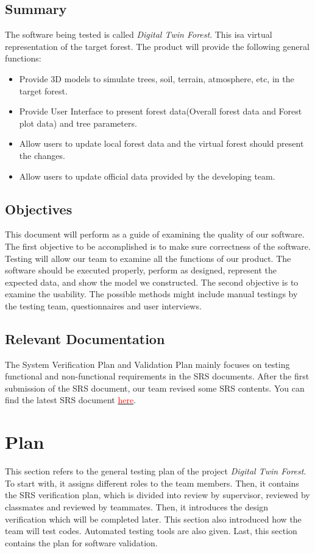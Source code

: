 \documentclass[12pt, titlepage]{article}
\begin{document}
\subsection{Summary}
The software being tested is called \textit{Digital Twin Forest}. This isa
virtual representation of the target forest. The product will provide the 
following general functions:
\begin{itemize}
    \item Provide 3D models to simulate trees, soil, terrain, atmosphere, etc,
    in the target forest.
    \item Provide User Interface to present forest data(Overall forest
    data and Forest plot data) and tree parameters.
    \item Allow users to update local forest data and the virtual forest
    should present the changes.
    \item Allow users to update official data provided by the developing
    team.
\end{itemize}

\subsection{Objectives}

This document will perform as a guide of examining the quality of our software. The
first objective to be accomplished is to make sure correctness of the software.
Testing will allow our team to examine all the functions of our product. The software
should be executed properly, perform as designed, represent the expected data, and
show the model we constructed. The second objective is to examine the usability. The
possible methods might include manual testings by the testing team, questionnaires and
user interviews. 

\subsection{Relevant Documentation}
The System Verification Plan and Validation Plan mainly focuses 
on testing functional and non-functional requirements in the SRS documents. After the first 
submission of the SRS document, our team revised some SRS contents. You
can find the latest SRS document
\href{https://github.com/wuj187/DigitalTwinCAS/blob/main/docs/SRSRevision/SRSRevision.pdf}{\textcolor{red}{here}}. 

\section{Plan}
This section refers to the general testing plan of the project \textit{Digital Twin Forest}. 
To start with, it assigns different roles to the team members. Then, it contains the
SRS verification plan, which is divided into review by supervisor, reviewed by classmates
and reviewed by teammates. Then, it introduces the design verification which will be
completed later. This section also introduced how the team will test codes. Automated
testing tools are also given. Last, this section contains the plan for software
validation.
\end{document}
